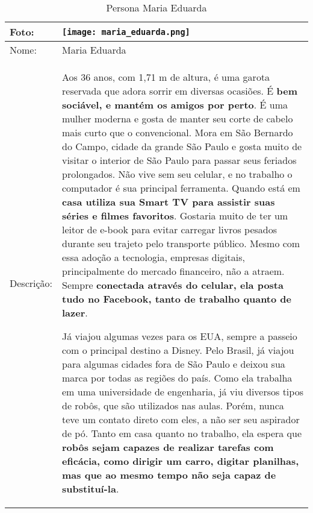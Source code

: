 \begin{table}[!ht]
	\caption{Persona Maria Eduarda}
	\label{tab:mariaeduarda}
	\centering
	\begin{tabular}{ m{2 cm} | m{13cm} }
		\hline
		Foto: & \rule{0cm}{2.7cm} \texttt{[image: maria\_eduarda.png]} \\
		\hline
		Nome: & Maria Eduarda \\
		\hline
		Descrição: & Aos 36 anos, com 1,71 m de altura, é uma garota reservada que adora sorrir em diversas ocasiões. É \textbf{bem sociável, e mantém os amigos por perto}. É uma mulher moderna e gosta de manter seu corte de cabelo mais curto que o convencional. Mora em São Bernardo do Campo, cidade da grande São Paulo e gosta muito de visitar o interior de São Paulo para passar seus feriados prolongados. Não vive sem seu celular, e no trabalho o computador é sua principal ferramenta. Quando está em \textbf{casa utiliza sua Smart TV para assistir suas séries e filmes favoritos}. Gostaria muito de ter um leitor de e-book para evitar carregar livros pesados durante seu trajeto pelo transporte público. Mesmo com essa adoção a tecnologia, empresas digitais, principalmente do mercado financeiro, não a atraem. Sempre \textbf{conectada através do celular, ela posta tudo no Facebook, tanto de trabalho quanto de lazer}.

		Já viajou algumas vezes para os EUA, sempre a passeio com o principal destino a Disney. Pelo Brasil, já viajou para algumas cidades fora de São Paulo e deixou sua marca por todas as regiões do país. Como ela trabalha em uma universidade de engenharia, já viu diversos tipos de robôs, que são utilizados nas aulas. Porém, nunca teve um contato direto com eles, a não ser seu aspirador de pó. Tanto em casa quanto no trabalho, ela espera que \textbf{robôs sejam capazes de realizar tarefas com eficácia, como dirigir um carro, digitar planilhas, mas que ao mesmo tempo não seja capaz de substituí-la}.\\
		\hline
	\end{tabular}
\end{table}

